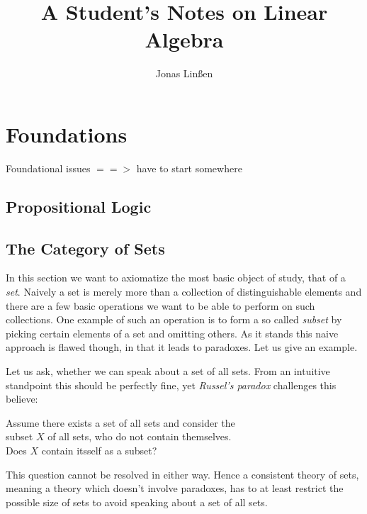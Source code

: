 

\title{A Student's Notes on Linear Algebra}
\author{Jonas Linßen}

\DeclareMathOperator{\pr}{pr}
\DeclareMathOperator{\incl}{in}
\DeclareMathOperator{\Eq}{Eq}


	\maketitle
	\tableofcontents

	\newpage
	\section{Foundations}
	Foundational issues $==>$ have to start somewhere

	\subsection{Propositional Logic}

	\newpage
	\subsection{The Category of Sets}

	In this section we want to axiomatize the most basic object of study, that of a \textit{set}. Naively a set is merely more than a collection of distinguishable elements and there are a few basic operations we want to be able to perform on such collections. One example of such an operation is to form a so called \textit{subset} by picking certain elements of a set and omitting others. As it stands this naive approach is flawed though, in that it leads to paradoxes. Let us give an example.

	Let us ask, whether we can speak about a set of all sets. From an intuitive standpoint this should be perfectly fine, yet \textit{Russel's paradox} challenges this believe:

	\begin{center}
		Assume there exists a set of all sets and consider
		the\\ subset $X$ of all sets, who do not contain themselves.\\
		Does $X$ contain itsself as a subset?
	\end{center}

	This question cannot be resolved in either way. Hence a consistent theory of sets, meaning a theory which doesn't involve paradoxes, has to at least restrict the possible size of sets to avoid speaking about a set of all sets.

